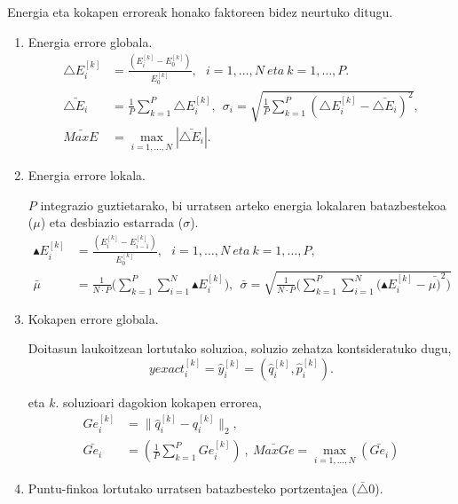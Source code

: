 Energia eta kokapen erroreak honako faktoreen bidez neurtuko ditugu.

\begin{enumerate}

\item Energia errore globala.
\begin{align*}
\triangle E_i^{[k]} &=\frac{(E^{[k]}_i-E^{[k]}_0)}{E^{[k]}_0}, \ \ \ i=1,\dots,N \ eta \ k=1,\dots,P.\\
\bar{\triangle E_i} &=\frac{1}{P} \sum_{k=1}^{P} \triangle E_i^{[k]}, \ \  \sigma_i =\sqrt{\frac{1}{P} \sum_{k=1}^{P} (\triangle E_i^{[k]}-\bar{\triangle E_i})^2},\\
\bar{MaxE } &=\max_{i=1,\dots,N} |\bar{\triangle E_i}|.
\end{align*}  

\item Energia errore lokala.

$P$ integrazio guztietarako, bi urratsen arteko energia lokalaren batazbestekoa ($\mu$) eta desbiazio estarrada ($\sigma$).            
\begin{align*}
\blacktriangle E_i^{[k]} &=\frac{(E^{[k]}_i-E^{[k]}_{i-1})}{E^{[k]}_0},\ \ \ i=1,\dots,N \ eta \ k=1,\dots,P, \\
\bar{\mu} &= \frac{1}{N\cdot P} \bigg(\sum_{k=1}^{P} \sum_{i=1}^{N} {\blacktriangle E_i^{[k]}\bigg)}, \ \
\bar{\sigma} = \sqrt{\frac{1}{N\cdot P} \bigg(\sum_{k=1}^{P} \sum_{i=1}^{N} {(\blacktriangle E_i^{[k]}-\bar{\mu)}^2}\bigg)}          
\end{align*}
           
\item Kokapen errore globala.

Doitasun laukoitzean lortutako soluzioa, soluzio zehatza kontsideratuko dugu,           
\begin{equation*}
yexact^{[k]}_i=\hat{y}^{[k]}_i=(\hat{q}^{[k]}_i,\hat{p}^{[k]}_i).
\end{equation*}

eta $k.$ soluzioari dagokion kokapen errorea,          
\begin{align*}
Ge^{[k]}_i &=\|\hat{q}^{[k]}_i-q^{[k]}_i\|_2, \\
\bar{Ge_i}  &= (\frac{1}{P}\sum_{k=1}^{P} Ge^{[k]}_i) \ , \
                          \bar{MaxGe}=\max_{i=1,\dots,N} (\bar{Ge_i})
\end{align*}     
           
\item Puntu-finkoa lortutako urratsen batazbesteko portzentajea ($\bar{\triangle}0$).
           

\end{enumerate}

